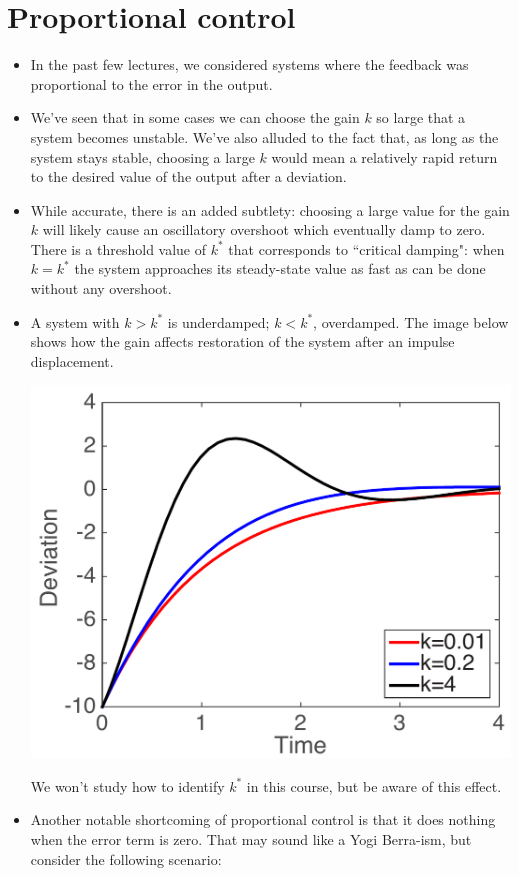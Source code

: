 \documentclass{article}
\begin{document}
\large

\section*{Proportional control}

\begin{itemize}

\item In the past few lectures, we considered systems where the feedback was proportional to the error in the output.

\item We've seen that in some cases we can choose the gain $k$ so large that a system becomes unstable. We've also alluded to the fact that, as long as the system stays stable, choosing a large $k$ would mean a relatively rapid return to the desired value of the output after a deviation.

\item While accurate, there is an added subtlety: choosing a large value for the gain $k$ will likely cause an oscillatory overshoot which eventually damp to zero. There is a threshold value of $k^*$ that corresponds to ``critical damping": when $k=k^*$ the system approaches its steady-state value as fast as can be done without any overshoot. 

\item A system with $k>k^*$ is underdamped; $k<k^*$, overdamped. The image below shows how the gain affects restoration of the system after an impulse displacement.

\begin{center}\includegraphics[width=0.4 \textwidth]{damping.pdf}\end{center}

We won't study how to identify $k^*$ in this course, but be aware of this effect.

\item Another notable shortcoming of proportional control is that it does nothing when the error term is zero. That may sound like a Yogi Berra-ism, but consider the following scenario:


\end{itemize}
\end{document}
